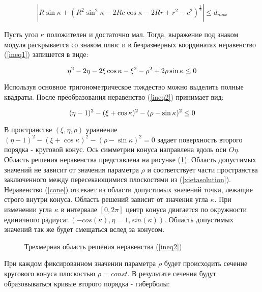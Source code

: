 \begin{equation}
\left|R\sin{\kappa}+\left(R^2\sin^2{\kappa}-2Rc\cos{\kappa}-2Rr+r^2-c^2\right)^{\frac{1}{2}}\right|\leq d_{max}
\label{ineq1}
\end{equation}

Пусть угол $\kappa$ положителен и достаточно мал. Тогда, выражение под знаком модуля раскрывается со знаком плюс и в безразмерных координатах неравенство (\ref{ineq1}) запишется в виде:

\begin{equation}
\eta^2-2\eta-2\xi\cos{\kappa}-\xi^2-\rho^2+2\rho\sin{\kappa}\leq 0\\
\label{ineq2}
\end{equation}

Используя основное тригонометрическое тождество можно выделить полные квадраты. После преобразования неравенство (\ref{ineq2}) принимает вид:

\begin{equation}
(\eta-1)^2-(\xi+\cos{\kappa})^2-(\rho-\sin{\kappa})^2 \leq 0\\
\label{cone}
\end{equation}

В пространстве $(\xi,\eta,\rho)$ уравнение $(\eta-1)^2-(\xi+\cos{\kappa})^2-(\rho-\sin{\kappa})^2 = 0$ задает поверхность второго порядка - круговой конус. Ось симметрии конуса направлена вдоль оси $O\eta$. Область решения неравенства представлена на рисунке (\ref{3dineq}). Область допустимых значений не зависит от значения параметра $\rho$ и соответствует части пространства заключенного между пересекающимися плоскостями из (\ref{xietasolution}). Неравенство (\ref{cone}) отсекает из области допустимых значений точки, лежащие строго внутри конуса. Область решений зависит от значения угла $\kappa$. При изменении угла $\kappa$ в интервале $[0,2\pi]$ центр конуса двигается по окружности единичного радиуса: $(-cos(\kappa),\eta=1,sin(\kappa))$. Область допустимых значений так же будет смещаться вслед за конусом.

\begin{figure}
\caption{Трехмерная область решения неравенства (\ref{ineq2})}
\label{3dineq}
\end{figure}

При каждом фиксированном значении параметра $\rho$ будет происходить сечение кругового конуса плоскостью $\rho=const$. В результате сечения будут образовываться кривые второго порядка - гиберболы:

